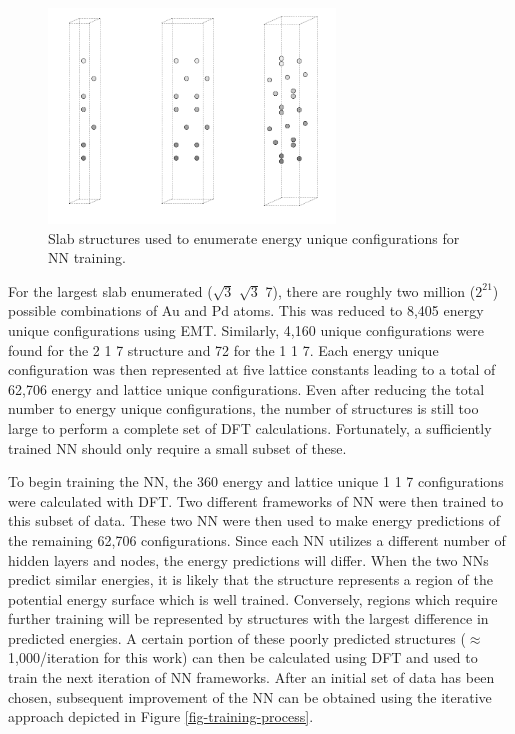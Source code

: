 \documentclass[12pt]{cmuthesis}
\begin{document}
\begin{figure}[h]
\centering
\includegraphics[width=3in]{./images/EMT-structures.png}
\caption{\label{fig-EMT-structures}
Slab structures used to enumerate energy unique configurations for NN training.}
\end{figure}

For the largest slab enumerated (\(\sqrt{3}\) \texttimes{} \(\sqrt{3}\) \texttimes{} 7), there are roughly two million (\(2^{21}\)) possible combinations of Au and Pd atoms. This was reduced to 8,405 energy unique configurations using EMT. Similarly, 4,160 unique configurations were found for the 2 \texttimes{} 1 \texttimes{} 7 structure and 72 for the 1 \texttimes{} 1 \texttimes{} 7. Each energy unique configuration was then represented at five lattice constants leading to a total of 62,706 energy and lattice unique configurations. Even after reducing the total number to energy unique configurations, the number of structures is still too large to perform a complete set of DFT calculations. Fortunately, a sufficiently trained NN should only require a small subset of these.

To begin training the NN, the 360 energy and lattice unique 1 \texttimes{} 1 \texttimes{} 7 configurations were calculated with DFT. Two different frameworks of NN were then trained to this subset of data. These two NN were then used to make energy predictions of the remaining 62,706 configurations. Since each NN utilizes a different number of hidden layers and nodes, the energy predictions will differ. When the two NNs predict similar energies, it is likely that the structure represents a region of the potential energy surface which is well trained. Conversely, regions which require further training will be represented by structures with the largest difference in predicted energies. A certain portion of these poorly predicted structures (\(\approx\) 1,000/iteration for this work) can then be calculated using DFT and used to train the next iteration of NN frameworks. After an initial set of data has been chosen, subsequent improvement of the NN can be obtained using the iterative approach depicted in Figure \ref{fig-training-process}.
\end{document}
